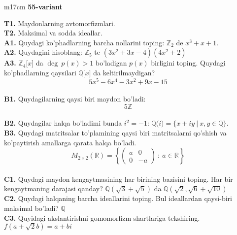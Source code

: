 \documentclass{article}
\begin{document}
\begin{tabular}{m{17cm}}
\textbf{55-variant}
\newline

\textbf{T1.} Maydonlarning avtomorfizmlari. \\
\textbf{T2.} Maksimal va sodda ideallar. \\
\textbf{A1.} Quydagi ko'phadlarning barcha nollarini toping:
\(\mathbb{Z}_{2}\) de \(x^{3} + x + 1\). \\
\textbf{A2.} Quydagini hisoblang:
\(\mathbb{Z}_{5}\) te \(\left( 3x^{2} + 3x - 4 \right)\left( 4x^{2} + 2 \right)\) \\
\textbf{A3.} \(\mathbb{Z}_{4}\lbrack x\rbrack\) da \(\deg\ p(x) > 1\) bo'ladigan \(p(x)\) birligini toping. Quydagi ko'phadlarning qaysilari \(\mathbb{Q\lbrack}x\rbrack\) da keltirilmaydigan?
\[5x^{5} - 6x^{4} - 3x^{2} + 9x - 15\] \\
\textbf{B1.} Quydagilarning qaysi biri maydon bo'ladi:
\[5\mathbb{Z}\] \\
\textbf{B2.} Quydagilar halqa bo'ladimi bunda \(i^{2} = - 1\):
\(\mathbb{Q(}i) = \{ x + iy\ |\ x,y \in \mathbb{Q\}}\). \\
\textbf{B3.} Quydagi matritsalar to'plamining qaysi biri matritsalarni qo'shish va ko'paytirish amallarga qarata halqa bo'ladi.
\[M_{2 \times 2}\mathbb{(R) =}\left\{ \begin{pmatrix}
a & 0 \\
0 & - a
\end{pmatrix}\ :\ a \in \mathbb{R} \right\}\] \\
\textbf{C1.} Quydagi maydon kengaytmasining har birining bazisini toping. Har bir kengaytmaning darajasi qanday?
\(\mathbb{Q}\left( \sqrt{3} + \sqrt{5} \right)\) da \(\mathbb{Q}\left( \sqrt{2},\sqrt{6} + \sqrt{10} \right)\) \\
\textbf{C2.} Quydagi halqaning barcha ideallarini toping. Bul ideallardan qaysi-biri maksimal bo'ladi? $\mathbb{Q}$ \\
\textbf{C3.} Quyidagi akslantirishni gomomorfizm shartlariga tekshiring. \(f\left( a + \sqrt{2}b \right) = a + bi\) \\

\end{tabular}
\vspace{1cm}
\end{document}
